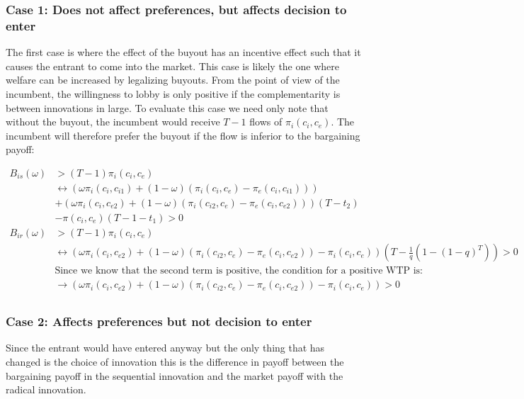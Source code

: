 \subsubsection{Case 1: Does not affect preferences, but affects decision to enter} \label{case:decision}
The first case is where the effect of the buyout has an incentive effect such that it causes the entrant to come into the market. This case is likely the one where welfare can be increased by legalizing buyouts. From the point of view of the incumbent, the willingness to lobby is only positive if the complementarity is between innovations in large. To evaluate this case we need only note that without the buyout, the incumbent would receive $T-1$ flows of $\pi_i(c_i,c_e)$. The incumbent will therefore prefer the buyout if the flow is inferior to the bargaining payoff: 

\begin{align*}
B_{is}(\omega)&>(T-1) \pi_i(c_i,c_e) \\
& \leftrightarrow (\omega \pi_i(c_i,c_{i1})+(1-\omega)(\pi_i(c_i,c_{e})-\pi_e(c_i,c_{i1}))) \\
&+(\omega \pi_i(c_i,c_{e2})+(1-\omega)(\pi_i(c_{i2},c_e)-\pi_e(c_{i},c_{e2})))(T-t_2)
\\&- \pi(c_i,c_e)(T-1-t_1)>0 \\
B_{ir}(\omega)&>(T-1)\pi_i(c_i,c_e) \\
& \leftrightarrow (\omega \pi_i(c_i,c_{e2})+(1-\omega)(\pi_{i}(c_{i2},c_{e})-\pi_{e}(c_{i},c_{e2}))-\pi_i(c_i,c_e)) \left( T - \frac{1}{q} \left( 1-(1-q)^{T} \right) \right)>0 \\
& \text{Since we know that the second term is positive, the condition for a positive WTP is:} \\
&\rightarrow
(\omega \pi_i(c_i,c_{e2})+(1-\omega)(\pi_{i}(c_{i2},c_{e})-\pi_{e}(c_{i},c_{e2}))-\pi_i(c_i,c_e))>0 \\
\end{align*}


\subsubsection{Case 2: Affects preferences but not decision to enter} \label{case:preference}

Since the entrant would have entered anyway but the only thing that has changed is the choice of innovation this is the difference in payoff between the bargaining payoff in the sequential innovation and the market payoff with the radical innovation. 

